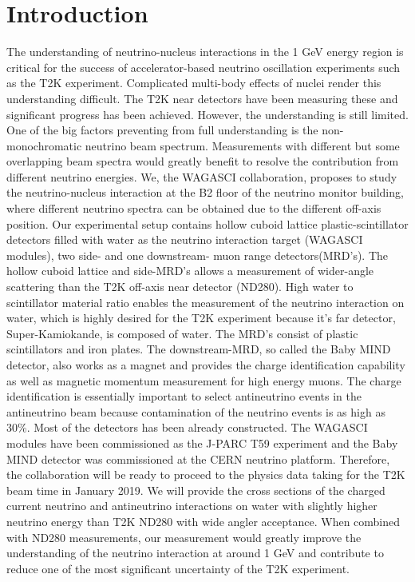 \section{Introduction}

The understanding of neutrino-nucleus interactions in the 1 GeV energy region is critical for the success
of accelerator-based neutrino oscillation experiments such as the T2K experiment.
Complicated multi-body effects of nuclei render this understanding difficult.
The T2K near detectors have been measuring these and significant progress has been achieved.
However, the understanding is still limited.
One of the big factors preventing from full understanding is the non-monochromatic
neutrino beam spectrum.
Measurements with different but some overlapping beam spectra would greatly benefit to resolve the contribution
from different neutrino energies.
We, the WAGASCI collaboration, proposes to study the neutrino-nucleus interaction
at the B2 floor of the neutrino monitor building, where different neutrino spectra
can be obtained due to the different off-axis position.
Our experimental setup contains hollow cuboid lattice plastic-scintillator detectors filled with water as the neutrino interaction target
(WAGASCI modules), two side- and one downstream- muon range detectors(MRD's).
The hollow cuboid lattice and side-MRD's allows a measurement of  wider-angle scattering than the T2K off-axis near detector (ND280).
High water to scintillator material ratio enables the measurement of the neutrino interaction on water, which
is highly desired for the T2K experiment because it's far detector, Super-Kamiokande, is composed of water.
The MRD's consist of plastic scintillators and iron plates.
The downstream-MRD, so called the Baby MIND detector, also works as a magnet and provides the charge identification capability as well as magnetic momentum measurement for high energy muons.
The charge identification is essentially important to select antineutrino events in the antineutrino beam
because contamination of the neutrino events is as high as 30\%.
Most of the detectors has been already constructed.
The WAGASCI modules have been commissioned as the J-PARC T59 experiment and the Baby MIND detector was commissioned at the CERN neutrino platform.
Therefore, the collaboration will be ready to proceed to the physics data taking for the T2K beam time in January 2019.
We will provide the cross sections of the charged current neutrino and antineutrino interactions on water
with slightly higher neutrino energy than T2K ND280 with wide angler acceptance.
When combined with ND280 measurements, our measurement would greatly improve the understanding of the neutrino interaction
at around 1 GeV and contribute to reduce one of the most significant uncertainty of the T2K experiment.
